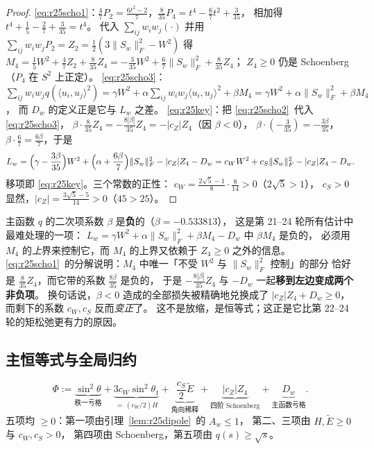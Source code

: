 \begin{proof}
\eqref{eq:r25scho1}：$\frac47P_2=\frac{6t^2-2}7$，$\frac8{35}P_4=t^4-\frac67t^2+\frac3{35}$，
相加得 $t^4+\frac15-\frac27+\frac3{35}=t^4$。
代入 $\sum_{ij}w_iw_j(\cdot)$ 并用 $\sum_{ij}w_iw_jP_2=Z_2=\frac12(3\|S_w\|_F^2-W^2)$ 得
$M_4=\frac15W^2+\frac47Z_2+\frac8{35}Z_4=-\frac3{35}W^2+\frac67\|S_w\|_F^2+\frac8{35}Z_4$；
$Z_4\ge0$ 仍是 Schoenberg（$P_4$ 在 $S^2$ 上正定）。
\eqref{eq:r25scho3}：$\sum_{ij}w_iw_jq(\langle u_i,u_j\rangle^2)
=\gamma W^2+\alpha\sum_{ij}w_iw_j\langle u_i,u_j\rangle^2+\beta M_4
=\gamma W^2+\alpha\|S_w\|_F^2+\beta M_4$，
而 $D_w$ 的定义正是它与 $L_w$ 之差。
\eqref{eq:r25key}：把 \eqref{eq:r25scho2}~代入 \eqref{eq:r25scho3}，
$\beta\cdot\frac8{35}Z_4=-\frac{8|\beta|}{35}Z_4=-|c_Z|Z_4$（因 $\beta<0$），
$\beta\cdot(-\frac3{35})=-\frac{3\beta}{35}$，$\beta\cdot\frac67=\frac{6\beta}7$，于是
\[
L_w=\Bigl(\gamma-\frac{3\beta}{35}\Bigr)W^2+\Bigl(\alpha+\frac{6\beta}7\Bigr)\|S_w\|_F^2
-|c_Z|Z_4-D_w=c_WW^2+c_S\|S_w\|_F^2-|c_Z|Z_4-D_w .
\]
移项即 \eqref{eq:r25key}。三个常数的正性：
$c_W=\frac{2\sqrt5-1}8\cdot\frac8{14}>0$（$2\sqrt5>1$），
$c_S>0$ 显然，$|c_Z|=\frac{3\sqrt5-5}{14}>0$（$45>25$）。
\end{proof}

\begin{remark}\label{rem:r25key}
主函数 $q$ 的二次项系数 $\beta$ 是\textbf{负}的（$\beta=-0.533813$），
这是第 21--24 轮所有估计中最难处理的一项：
$L_w=\gamma W^2+\alpha\|S_w\|_F^2+\beta M_4-D_w$ 中 $\beta M_4$ 是负的，
必须用 $M_4$ 的\emph{上}界来控制它，而 $M_4$ 的上界又依赖于 $Z_4\ge0$ 之外的信息。
\eqref{eq:r25scho1}~的分解说明：$M_4$ 中唯一「不受 $W^2$ 与 $\|S_w\|_F^2$ 控制」的部分
恰好是 $\frac8{35}Z_4$，而它带的系数 $\frac{8\beta}{35}$ 是负的，
于是 $-\frac{8|\beta|}{35}Z_4$ 与 $-D_w$ 一起\textbf{移到左边变成两个非负项}。
换句话说，$\beta<0$ 造成的全部损失被精确地兑换成了
$|c_Z|Z_4+D_w\ge0$，而剩下的系数 $c_W,c_S$ 反而\emph{变正}了。
这不是放缩，是恒等式；这正是它比第 22--24 轮的矩松弛更有力的原因。
\end{remark}

\subsection{主恒等式与全局归约}\label{sec:r25:main}

\begin{definition}[五项亏格]\label{def:r25phi}
\begin{equation}\label{eq:r25phi}
\Phi:=\underbrace{\sin^2\theta}_{\text{秩一亏格}}
+\underbrace{3c_W\sin^2\theta_1}_{=\,(c_W/2)H}
+\underbrace{\frac{c_S}2\widetilde E}_{\text{角向稀释}}
+\underbrace{|c_Z|Z_4}_{\text{四阶 Schoenberg}}
+\underbrace{D_w}_{\text{主函数亏格}} .
\end{equation}
五项均 $\ge0$：第一项由引理~\ref{lem:r25dipole}~的 $A_w\le1$，
第二、三项由 $H,\widetilde E\ge0$ 与 $c_W,c_S>0$，
第四项由 Schoenberg，第五项由 $q(s)\ge\sqrt s$。
\end{definition}

